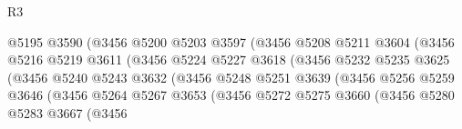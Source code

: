 \begin{lexlean}{R3}
\begin{coremodule}
                                      @5195
                                      @3590
                                      (@3456
                                        @5200
                                        @5203
                                        @3597
                                        (@3456
                                          @5208
                                          @5211
                                          @3604
                                          (@3456
                                            @5216
                                            @5219
                                            @3611
                                            (@3456
                                              @5224
                                              @5227
                                              @3618
                                              (@3456
                                                @5232
                                                @5235
                                                @3625
                                                (@3456
                                                  @5240
                                                  @5243
                                                  @3632
                                                  (@3456
                                                    @5248
                                                    @5251
                                                    @3639
                                                    (@3456
                                                      @5256
                                                      @5259
                                                      @3646
                                                      (@3456
                                                        @5264
                                                        @5267
                                                        @3653
                                                        (@3456
                                                          @5272
                                                          @5275
                                                          @3660
                                                          (@3456
                                                            @5280
                                                            @5283
                                                            @3667
                                                            (@3456

\end{coremodule}
\end{lexlean}
